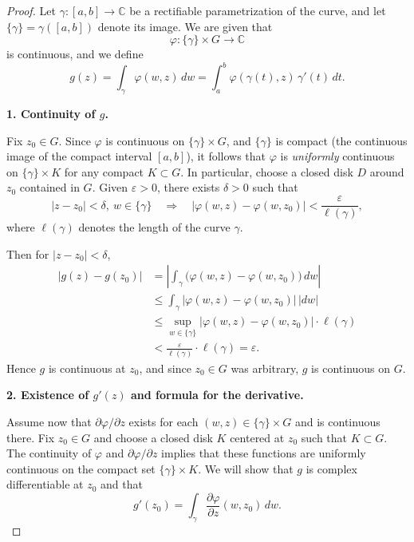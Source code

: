 \documentclass[12pt, a4paper]{report}
\theoremstyle{spaced}
\begin{document}
\begin{proof}
	Let $\gamma : [a,b] \to \mathbb{C}$ be a rectifiable parametrization of the curve,
	and let $\{\gamma\} = \gamma([a,b])$ denote its image.
	We are given that
	\[
		\varphi : \{\gamma\} \times G \to \mathbb{C}
	\]
	is continuous, and we define
	\[
		g(z) = \int_{\gamma} \varphi(w,z)\,dw
		= \int_a^b \varphi(\gamma(t),z)\,\gamma'(t)\,dt.
	\]

	\medskip
	\noindent\textbf{1. Continuity of $g$.}

	Fix $z_0 \in G$.
	Since $\varphi$ is continuous on $\{\gamma\}\times G$, and $\{\gamma\}$ is compact
	(the continuous image of the compact interval $[a,b]$),
	it follows that $\varphi$ is \emph{uniformly} continuous on
	$\{\gamma\}\times K$ for any compact $K\subset G$.
	In particular, choose a closed disk $D$ around $z_0$ contained in $G$.
	Given $\varepsilon>0$, there exists $\delta>0$ such that
	\[
		|z-z_0|<\delta,\ w\in \{\gamma\}
		\quad\Longrightarrow\quad
		|\varphi(w,z)-\varphi(w,z_0)|<\frac{\varepsilon}{\ell(\gamma)},
	\]
	where $\ell(\gamma)$ denotes the length of the curve $\gamma$.

	Then for $|z-z_0|<\delta$,
	\[
		\begin{aligned}
			|g(z)-g(z_0)|
			 & = \left|\int_{\gamma} \bigl(\varphi(w,z)-\varphi(w,z_0)\bigr)\,dw\right|   \\
			 & \le \int_{\gamma} |\varphi(w,z)-\varphi(w,z_0)|\,|dw|                      \\
			 & \le \sup_{w\in\{\gamma\}} |\varphi(w,z)-\varphi(w,z_0)| \cdot \ell(\gamma) \\
			 & < \frac{\varepsilon}{\ell(\gamma)}\cdot \ell(\gamma)
			= \varepsilon.
		\end{aligned}
	\]
	Hence $g$ is continuous at $z_0$, and since $z_0\in G$ was arbitrary, $g$ is continuous on $G$.

	\medskip
	\noindent\textbf{2. Existence of $g'(z)$ and formula for the derivative.}

	Assume now that $\partial\varphi/\partial z$ exists for each $(w,z)\in \{\gamma\}\times G$
	and is continuous there.
	Fix $z_0\in G$ and choose a closed disk $K$ centered at $z_0$ such that $K\subset G$.
	The continuity of $\varphi$ and $\partial\varphi/\partial z$ implies that these functions
	are uniformly continuous on the compact set $\{\gamma\}\times K$.
	We will show that $g$ is complex differentiable at $z_0$ and that
	\[
		g'(z_0) = \int_{\gamma} \frac{\partial\varphi}{\partial z}(w,z_0)\,dw.
	\]


\end{proof}
\end{document}
